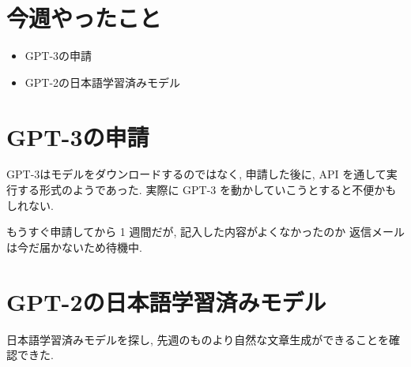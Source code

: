 \documentclass[twocolumn]{jarticle}     %
\begin{document}



\section{今週やったこと}
\begin{itemize}
  \item GPT-3の申請
  \item GPT-2の日本語学習済みモデル
\end{itemize}

\section{GPT-3の申請}
GPT-3はモデルをダウンロードするのではなく,
申請した後に, API を通して実行する形式のようであった.
実際に GPT-3 を動かしていこうとすると不便かもしれない.

もうすぐ申請してから 1 週間だが, 記入した内容がよくなかったのか
返信メールは今だ届かないため待機中.

\section{GPT-2の日本語学習済みモデル}
日本語学習済みモデルを探し, 先週のものより自然な文章生成ができることを確認できた.
\end{document}
